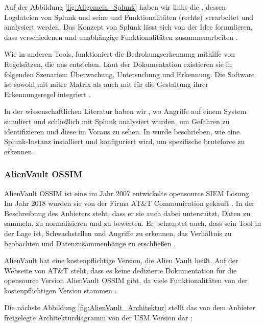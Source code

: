 
Auf der Abbildung \ref{fig:Allgemein_Splunk} haben wir links die , dessen Logdateien von Splunk und seine  und Funktionalitäten (rechts) verarbeitet und analysiert werden. Das Konzept von Splunk lässt sich von der Idee formulieren, dass verschiedenen und unabhängige Funktionalitäten zusammenarbeiten \citep{Splunk_platform}.

Wie in anderen Tools, funktioniert die Bedrohungserkennung mithilfe von Regelsätzen, die aus  entstehen. Laut der Dokumentation existieren sie in folgenden Szenarien: Überwachung, Untersuchung und Erkennung. Die Software ist sowohl mit \gls{mitre} Matrix als auch mit  für die Gestaltung ihrer Erkennungsregel integriert \citep{Splunk_usecases}.

In der wissenschaftlichen Literatur haben wir \cite{Su_SplunkDDOS}, wo Angriffe auf einem System simuliert und schließlich mit Splunk analysiert wurden, um Gefahren zu identifizieren und diese im Voraus zu sehen. In \cite{Selvaganesh_SplunkBruteForce} wurde beschrieben, wie eine Splunk-Instanz installiert und konfiguriert wird, um spezifische \gls{bruteforce} zu erkennen.

\subsubsection{AlienVault OSSIM}
AlienVault OSSIM ist eine im Jahr 2007 entwickelte \gls{opensource} \gls{SIEM} Lösung. Im Jahr 2018 wurden sie von der Firma AT\&T Communication gekauft  \citep{CBN_AV}. In der Beschreibung des Anbieters steht, dass er sie auch dabei unterstützt, Daten zu sammeln, zu normalisieren und zu bewerten. Er behauptet auch, dass sein Tool in der Lage ist, Schwachstellen und Angriffe zu erkennen, das Verhältnis zu beobachten und Datenzusammenhänge zu erschließen \citep{ATT_AVO}.

AlienVault hat eine kostenpflichtige Version, die Alien Vault  heißt. Auf der Webseite von AT\&T steht, dass es keine dedizierte Dokumentation für die \gls{opensource} Version AlienVault OSSIM gibt, da viele Funktionalitäten von der kostenpflichtigen Version stammen \citep{ATT_AVO}.

Die nächste Abbildung \ref{fig:AlienVault_Architektur} stellt das von dem Anbieter freigelegte Architekturdiagramm von der \gls{USM} Version dar \citep{ATT_AVO}:


